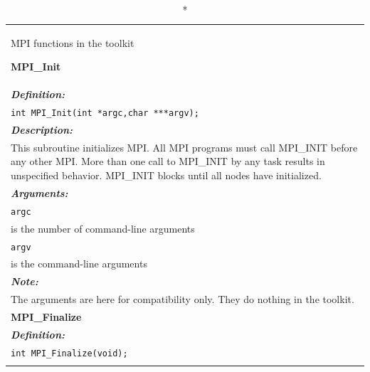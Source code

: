 \pagebreak[4]
\begin{longtable}{|p{5.5in}|}

\caption*{MPI functions in the toolkit \cite{ref:2010-llnl-mpi_reference}}\label{tab:api:mpi_functions}
\endfirsthead
\endhead
\endfoot
\endlastfoot

\hline

\vspace{-0.8cm}

\LARGE{\bfseries{MPI\_Init}} \\

\vspace{-0.3cm}

\emph{\bfseries{Definition:}} \\
\lstinline$int MPI_Init(int *argc,char ***argv);$ \\
\vspace{-0.3cm}

\emph{\bfseries{Description:}} \\
This subroutine initializes MPI. All MPI programs must call MPI\_INIT before any other MPI. More than one call to MPI\_INIT by any task results in unspecified behavior. MPI\_INIT blocks until all nodes have initialized. \\
\vspace{-0.3cm}

\emph{\bfseries{Arguments:}} \\
\lstinline$argc$ \\
\hspace{0.5cm}is the number of command-line arguments \\
\lstinline$argv$ \\
\hspace{0.5cm}is the command-line arguments \\
\vspace{-0.3cm}

\emph{\bfseries{Note:}} \\
The arguments are here for compatibility only. They do nothing in the toolkit. \\

\hline

\vspace{-0.8cm}

\LARGE{\bfseries{MPI\_Finalize}} \\

\vspace{-0.3cm}

\emph{\bfseries{Definition:}} \\
\lstinline$int MPI_Finalize(void);$ \\
\vspace{-0.3cm}


\end{longtable}
